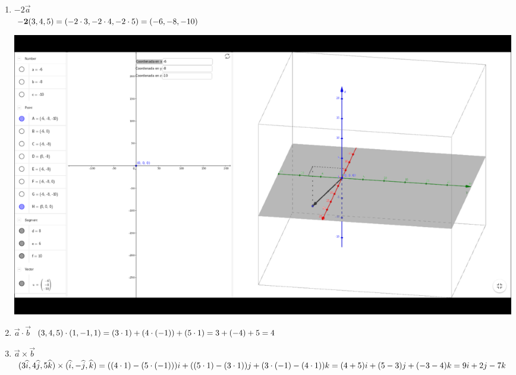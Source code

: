 \documentclass[10pt,letterpaper,fleqn]{article}
\begin{document}
\begin{enumerate}
\begin{enumerate}
\begin{center}
            \end{center}
          \item $-2 \overrightarrow{a}$ \\
            $
              {\bf -2}(3,4,5) \\
              = (-2\cdot 3, -2\cdot 4, -2\cdot 5) \\
              = (-6,-8,-10)
            $
            \\
            \begin{center}
                \includegraphics[scale=.3]{assets/img/Ejercicio1(c).png}
            \end{center}
          \item $\overrightarrow{a} \cdot \overrightarrow{b}$
            $
              (3,4,5) \cdot (1,-1,1) \\
              = (3 \cdot 1) + (4 \cdot (-1)) + (5 \cdot 1) \\
              = 3 + (-4) + 5 \\
              = 4
            $
            \\
          \item $\overrightarrow{a} \times \overrightarrow{b}$
            $
            (3\widehat{i}, 4\widehat{j}, 5\widehat{k}) \times
            (\widehat{i}, -\widehat{j},\widehat{k}) \\
            = ((4\cdot 1) - (5\cdot(-1)))i + ((5\cdot 1) - (3\cdot 1))j +
            (3\cdot(-1) - (4\cdot 1))k \\
            = (4+5)i + (5-3)j + (-3-4)k \\
            = 9i + 2j -7k
            $
            \\
            \begin{center}

\end{center}
\end{enumerate}
\end{enumerate}
\end{document}
